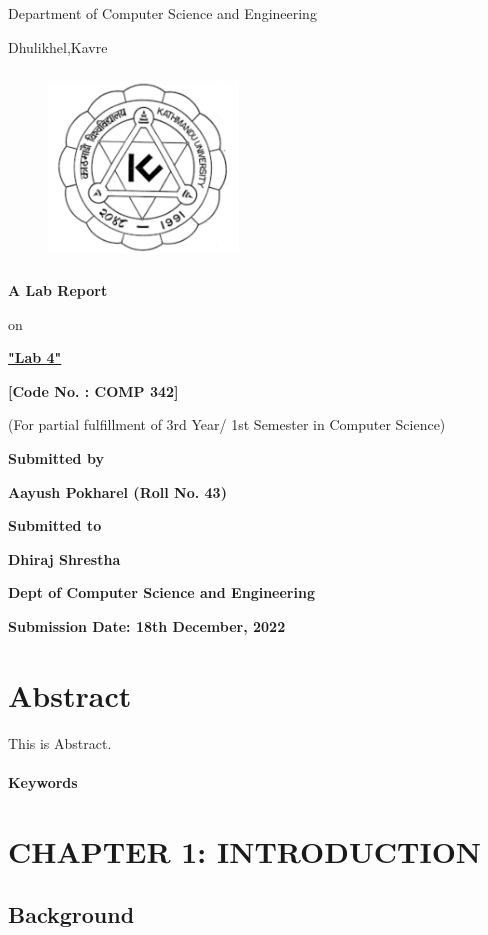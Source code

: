 \documentclass[12pt]{article}
\begin{document}
\thispagestyle{empty}

\section*{}
 {\LARGE{}}

\centerline{Department of Computer Science and Engineering}
\centerline{Dhulikhel,Kavre}
\begin{figure}[h]
    \centerline{\includegraphics[width=50.546mm,height=50.546mm]{KU_Logo.png}}
\end{figure}

\centerline{\textbf{A Lab Report}}
\centerline{on}
\centerline{\underline{\textbf{"Lab 4"}}}

\vspace*{12mm}

\centerline{\textbf{[Code No. : COMP 342]}}
\centerline{(For partial fulfillment of 3rd Year/ 1st Semester in Computer Science)}

\vspace*{20mm}

\centerline{\textbf{Submitted by}}
\centerline{\textbf{Aayush Pokharel (Roll No. 43)}}


\vspace*{26mm}


\centerline{\textbf{Submitted to}}
\centerline{\textbf{Dhiraj Shrestha}}
\centerline{\textbf{Dept of Computer Science and Engineering}}

\vspace*{20mm}

\centerline{\textbf{Submission Date: 18th December, 2022}}



\clearpage
\thispagestyle{empty}

\section*{Abstract}
This is Abstract.
\\\\
\textbf{Keywords }

\clearpage
\thispagestyle{empty}
\tableofcontents

\clearpage
\thispagestyle{empty}
\listoffigures

\clearpage
{}
\section{CHAPTER 1: INTRODUCTION}

\subsection{Background}

\clearpage
\thispagestyle{empty}
\printbibliography
\end{document}
